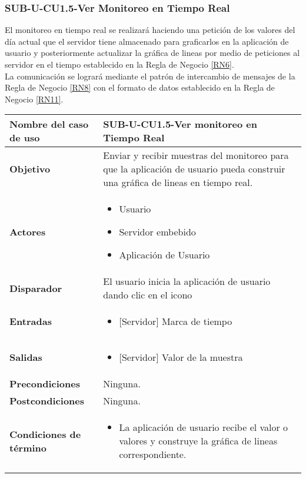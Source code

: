\subsubsection{SUB-U-CU1.5-Ver Monitoreo en Tiempo Real}\label{SUB-U-CU1.5}
El monitoreo en tiempo real se realizará haciendo una petición de los valores del día actual que el servidor tiene almacenado para graficarlos en la aplicación de usuario y posteriormente actualizar la gráfica de lineas por medio de peticiones al servidor en el tiempo establecido en la Regla de Negocio \ref{RN6}.
\\ La comunicación se logrará mediante el patrón de intercambio de mensajes de la Regla de Negocio \ref{RN8} con el formato de datos establecido en la Regla de Negocio \ref{RN11}. 

\begin{longtable}{|J{5cm}|J{10.3cm}|}
	\hline
	\textbf{Nombre del caso de uso} &
		SUB-U-CU1.5-Ver monitoreo en Tiempo Real \\ \hline
	\textbf{Objetivo} &
		Enviar y recibir muestras del monitoreo para que la aplicación de usuario pueda construir una gráfica de lineas en tiempo real. \\ \hline
	\textbf{Actores} &
		\begin{itemize}
		    \item Usuario
			\item Servidor embebido
			\item Aplicación de Usuario
		\end{itemize} \\ \hline
	\textbf{Disparador} & 
	    El usuario inicia la aplicación de usuario dando clic en el icono \\ \hline 
	\textbf{Entradas} & 
		\begin{itemize}
				\item{[Servidor]} Marca de tiempo
		\end{itemize}\\ \hline 
	\textbf{Salidas} & 
		\begin{itemize}
			\item{[Servidor]} Valor de la muestra
		\end{itemize} \\ \hline
	\textbf{Precondiciones} &
		Ninguna. \\ \hline
	\textbf{Postcondiciones} &
		Ninguna.\\ \hline
	\textbf{Condiciones de término} & 
		\begin{itemize}
			\item La aplicación de usuario recibe el valor o valores y construye la gráfica de lineas correspondiente.

\end{itemize}
\end{longtable}
